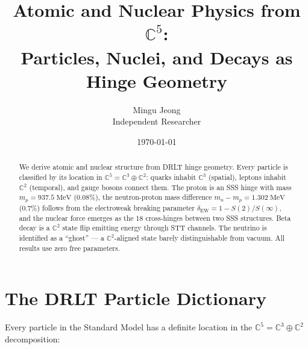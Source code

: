 \documentclass[12pt]{article}
\theoremstyle{remark}
\begin{document}
\title{Atomic and Nuclear Physics from $\mathbb{C}^5$:\\Particles, Nuclei, and Decays as Hinge Geometry}
\author{Mingu Jeong\\Independent Researcher}
\date{\today}
\maketitle

\begin{abstract}
We derive atomic and nuclear structure from DRLT hinge geometry. Every particle is classified by its location in $\mathbb{C}^5 = \mathbb{C}^3 \oplus \mathbb{C}^2$: quarks inhabit $\mathbb{C}^3$ (spatial), leptons inhabit $\mathbb{C}^2$ (temporal), and gauge bosons connect them. The proton is an SSS hinge with mass $m_p = 937.5\;\text{MeV}$ (0.08\%), the neutron-proton mass difference $m_n - m_p = 1.302\;\text{MeV}$ (0.7\%) follows from the electroweak breaking parameter $\delta_\text{EW} = 1 - S(2)/S(\infty)$, and the nuclear force emerges as the 18 cross-hinges between two SSS structures. Beta decay is a $\mathbb{C}^2$ state flip emitting energy through STT channels. The neutrino is identified as a ``ghost'' --- a $\mathbb{C}^2$-aligned state barely distinguishable from vacuum. All results use zero free parameters.
\end{abstract}

\tableofcontents

\section{The DRLT Particle Dictionary}

Every particle in the Standard Model has a definite location in the $\mathbb{C}^5 = \mathbb{C}^3 \oplus \mathbb{C}^2$ decomposition:
\end{document}
